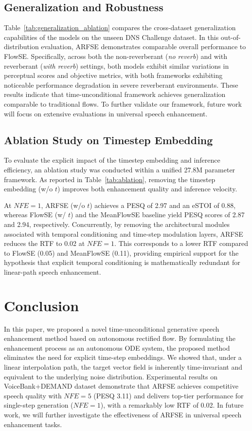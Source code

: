 \documentclass[cameraready]{Interspeech}
\begin{document}
\subsection{Generalization and Robustness}
Table~\ref{tab:generalization_ablation} compares the cross-dataset generalization capabilities of the models on the unseen DNS Challenge dataset. In this out-of-distribution evaluation, ARFSE demonstrates comparable overall performance to FlowSE. Specifically, across both the non-reverberant (\textit{no reverb}) and with reverberant (\textit{with reverb}) settings, both models exhibit similar variations in perceptual scores and objective metrics, with both frameworks exhibiting noticeable performance degradation in severe reverberant environments. These results indicate that time-unconditional framework achieves generalization comparable to traditional flows. To further validate our framework, future work will focus on extensive evaluations in universal speech enhancement.

\subsection{Ablation Study on Timestep Embedding}
To evaluate the explicit impact of the timestep embedding and inference efficiency, an ablation study was conducted within a unified 27.8M parameter framework. As reported in Table~\ref{tab:ablation}, removing the timestep embedding (w/o $t$) improves both enhancement quality and inference velocity.

At $NFE=1$, ARFSE (w/o $t$) achieves a PESQ of 2.97 and an eSTOI of 0.88, whereas FlowSE (w/ $t$) and the MeanFlowSE baseline yield PESQ scores of 2.87 and 2.94, respectively. Concurrently, by removing the architectural modules associated with temporal conditioning and time-step modulation layers, ARFSE reduces the RTF to 0.02 at $NFE=1$. This corresponds to a lower RTF compared to FlowSE (0.05) and MeanFlowSE (0.11), providing empirical support for the hypothesis that explicit temporal conditioning is mathematically redundant for linear-path speech enhancement.

\section{Conclusion}
In this paper, we proposed a novel time-unconditional generative speech enhancement method based on autonomous rectified flow. By formulating the enhancement process as an autonomous ODE system, the proposed method eliminates the need for explicit time-step embeddings. We showed that, under a linear interpolation path, the target vector field is inherently time-invariant and equivalent to the underlying noise distribution. Experimental results on VoiceBank+DEMAND dataset demonstrate that ARFSE achieves competitive speech quality with $NFE=5$ (PESQ 3.11) and delivers top-tier performance for single-step generation ($NFE=1$), with a remarkably low RTF of 0.02. In future work, we will further investigate the effectiveness of ARFSE in universal speech enhancement tasks.
\end{document}
